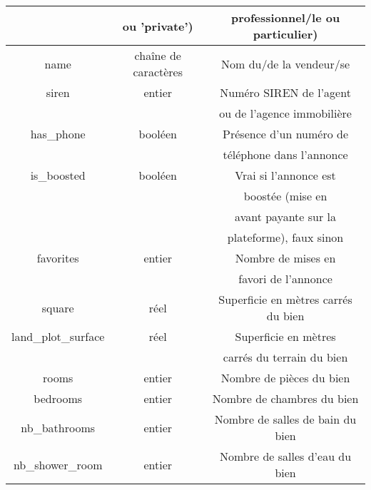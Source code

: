 \documentclass[a4paper, 12pt, twoside]{report}
\begin{document}
\begin{longtable}[c]{|c|c|c|}
				& ou 'private') & professionnel/le ou particulier) \\ 
				\hline 
				name & chaîne de caractères & Nom du/de la vendeur/se \\ 
				\hline 
				siren & entier & Numéro SIREN de l'agent \\ 
				& & ou de l'agence immobilière \\ 
				\hline 
				has\_phone & booléen & Présence d'un numéro de \\ 
				& & téléphone dans l'annonce \\ 
				\hline 
				is\_boosted & booléen & Vrai si l'annonce est \\ 
				& & boostée (mise en \\ 
				& & avant payante sur la \\ 
				& & plateforme), faux sinon \\ 
				\hline 
				favorites & entier & Nombre de mises en \\ 
				& & favori de l'annonce \\ 
				\hline 
				square & réel & Superficie en mètres carrés du bien \\ 
				\hline 
				land\_plot\_surface & réel & Superficie en mètres \\ 
				& & carrés du terrain du bien \\ 
				\hline 
				rooms & entier & Nombre de pièces du bien \\ 
				\hline 
				bedrooms & entier & Nombre de chambres du bien \\ 
				\hline 
				nb\_bathrooms & entier & Nombre de salles de bain du bien \\ 
				\hline 
				nb\_shower\_room & entier & Nombre de salles d'eau du bien \\ 
				\hline 
			\endfirsthead
			

\end{longtable}
\end{document}
